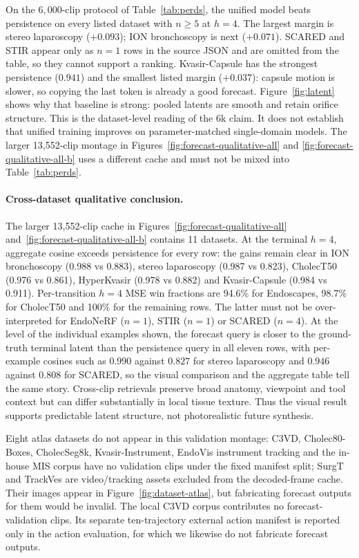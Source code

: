 \documentclass[preprint,12pt]{elsarticle}
\begin{document}
On the $6{,}000$-clip protocol of Table~\ref{tab:perds}, the unified model
beats persistence on every listed dataset with $n{\ge}5$ at $h{=}4$.
The largest margin is stereo laparoscopy ($+0.093$); ION bronchoscopy is next
($+0.071$). SCARED and STIR appear only as $n{=}1$ rows in the source JSON
and are omitted from the table, so they cannot support a ranking.
Kvasir-Capsule has the strongest persistence ($0.941$)
and the smallest listed margin ($+0.037$): capsule motion is
slower, so copying the last token is already a good forecast.
Figure~\ref{fig:latent} shows why that baseline is strong: pooled latents are
smooth and retain orifice structure. This is the dataset-level reading of the
$6$k claim. It does not establish that unified training improves on
parameter-matched single-domain models. The larger 13{,}552-clip montage in
Figures~\ref{fig:forecast-qualitative-all} and
\ref{fig:forecast-qualitative-all-b} uses a different cache and must not be
mixed into Table~\ref{tab:perds}.

\paragraph{Cross-dataset qualitative conclusion.}
The larger 13,552-clip cache in Figures~\ref{fig:forecast-qualitative-all}
and~\ref{fig:forecast-qualitative-all-b}
contains 11 datasets. At the terminal $h{=}4$, aggregate cosine exceeds
persistence for every row: the gains remain clear in ION bronchoscopy
(0.988 vs 0.883), stereo laparoscopy (0.987 vs 0.823), CholecT50
(0.976 vs 0.861), HyperKvasir (0.978 vs 0.882) and Kvasir-Capsule
(0.984 vs 0.911). Per-transition $h{=}4$ MSE win fractions are 94.6\%
for Endoscapes, 98.7\% for CholecT50 and 100\% for the remaining rows.
The latter must not be over-interpreted for EndoNeRF ($n=1$), STIR ($n=1$)
or SCARED ($n=4$). At the level of the individual examples shown, the forecast
query is closer to the ground-truth terminal latent than the persistence query
in all eleven rows, with per-example cosines such as $0.990$ against $0.827$
for stereo laparoscopy and $0.946$ against $0.808$ for SCARED, so the visual
comparison and the aggregate table tell the same story.
Cross-clip retrievals preserve broad anatomy, viewpoint and
tool context but can differ substantially in local tissue texture. Thus the
visual result supports predictable latent structure, not photorealistic future
synthesis.

Eight atlas datasets do not appear in this validation montage:
C3VD, Cholec80-Boxes, CholecSeg8k, Kvasir-Instrument,
EndoVis instrument tracking and the in-house MIS corpus have no validation clips under the
fixed manifest split; SurgT and TrackVes are video/tracking assets excluded
from the decoded-frame cache. Their images appear in
Figure~\ref{fig:dataset-atlas}, but fabricating forecast outputs for them
would be invalid. The local C3VD corpus contributes no forecast-validation
clips. Its separate ten-trajectory external action manifest is reported only
in the action evaluation, for which we likewise do not fabricate forecast
outputs.
\end{document}

